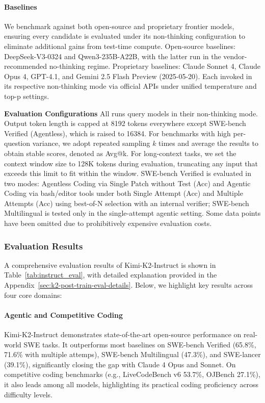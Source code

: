 \paragraph{Baselines}{
We benchmark against both open-source and proprietary frontier models, ensuring every candidate is evaluated under its non-thinking configuration to eliminate additional gains from test-time compute.
Open-source baselines: DeepSeek-V3-0324 and Qwen3-235B-A22B, with the latter run in the vendor-recommended no-thinking regime.
Proprietary baselines: Claude Sonnet 4, Claude Opus 4, GPT-4.1, and Gemini 2.5 Flash Preview (2025-05-20). Each invoked in its respective non-thinking mode via official APIs under unified temperature and top-p settings.

\textbf{Evaluation Configurations} All runs query models in their non-thinking mode. Output token length is capped at 8192 tokens everywhere except SWE-bench Verified (Agentless), which is raised to 16384. 
For benchmarks with high per-question variance, we adopt repeated sampling $k$ times and average the results to obtain stable scores, denoted as Avg@k.
For long-context tasks, we set the context window size to 128K tokens during evaluation, truncating any input that exceeds this limit to fit within the window.
SWE-bench Verified is evaluated in two modes: Agentless Coding via Single Patch without Test (Acc) and Agentic Coding via bash/editor tools under both Single Attempt (Acc) and Multiple Attempts (Acc) using best-of-N selection with an internal verifier; SWE-bench Multilingual is tested only in the single-attempt agentic setting. Some data points have been omitted due to prohibitively expensive evaluation costs.
}



\subsubsection{Evaluation Results}

A comprehensive evaluation results of Kimi-K2-Instruct is shown in Table~\ref{tab:instruct_eval}, with detailed explanation provided in the Appendix~\ref{sec:k2-post-train-eval-details}. Below, we highlight key results across four core domains:

\paragraph{Agentic and Competitive Coding}
Kimi-K2-Instruct demonstrates state-of-the-art open-source performance on real-world SWE tasks. It outperforms most baselines on SWE-bench Verified (65.8\%, 71.6\% with multiple attemps), SWE-bench Multilingual (47.3\%), and SWE-lancer (39.1\%), significantly closing the gap with Claude 4 Opus and Sonnet. On competitive coding benchmarks (e.g., LiveCodeBench v6 53.7\%, OJBench 27.1\%), it also leads among all models, highlighting its practical coding proficiency across difficulty levels.

